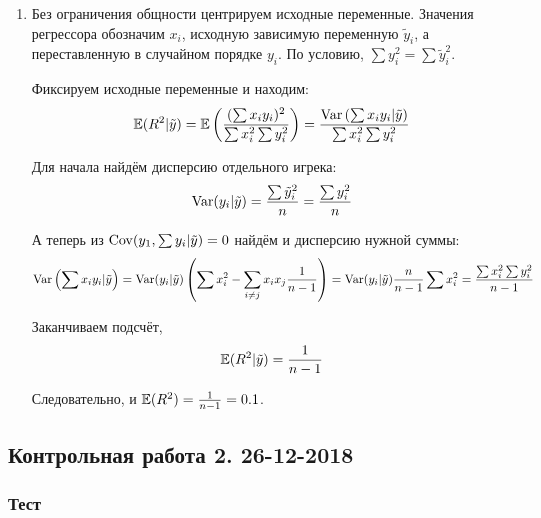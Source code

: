 \begin{enumerate}
\item Без ограничения общности центрируем исходные переменные.
Значения регрессора обозначим $x_i$, исходную зависимую переменную $\tilde{y}_i$,
а переставленную в случайном порядке $y_i$.
По условию, $\sum y_i^2 = \sum \tilde{y}_i^2$.

Фиксируем исходные переменные и находим:
\[
\operatorname{\mathbb{E}}(R^2 | \tilde{y}) = \operatorname{\mathbb{E}}\left( \frac{(\sum x_i y_i )^2}{\sum x_i^2 \sum y_i^2}  \right) =
\frac{\operatorname{Var}\left(\sum x_i y_i | \tilde{y}\right)}{\sum x_i^2 \sum y_i^2}
\]

Для начала найдём дисперсию отдельного игрека:
\[
\operatorname{Var}(y_i | \tilde{y}) = \frac{\sum \tilde{y}_i^2}{n} = \frac{\sum y_i^2}{n}
\]

А теперь из $\operatorname{Cov}(y_1, \sum y_i | \tilde{y}) =0$ найдём и дисперсию нужной суммы:
\[
\operatorname{Var}\left(\sum x_i y_i | \tilde{y}\right) =
\operatorname{Var}(y_i | \tilde{y}) \left(  \sum x_i^2 - \sum_{i\neq j} x_i x_j \frac{1}{n-1}  \right) =
\operatorname{Var}(y_i | \tilde{y}) \frac{n}{n-1} \sum x_i^2 = \frac{\sum x_i^2 \sum y_i^2 }{n-1}
\]

Заканчиваем подсчёт,
\[
\operatorname{\mathbb{E}}(R^2 | \tilde{y}) = \frac{1}{n-1}
\]

Следовательно, и $\operatorname{\mathbb{E}}(R^2) = \frac{1}{n-1} = 0.1$.

\end{enumerate}


\subsection{Контрольная работа 2. 26-12-2018}

\subsubsection*{Тест}












